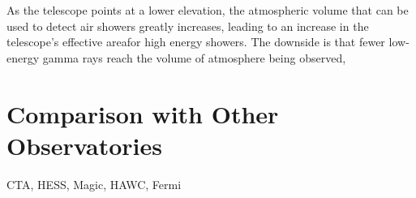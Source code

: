 As the telescope points at a lower elevation, the atmospheric volume that can be used to detect air showers greatly increases, leading to an increase in the telescope's effective areafor high energy showers.
The downside is that fewer low-energy gamma rays reach the volume of atmosphere being observed, 


\section{Comparison with Other Observatories}


CTA, HESS, Magic, HAWC, Fermi



